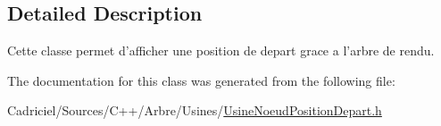 \subsection{Detailed Description}
Cette classe permet d'afficher une position de depart grace a l'arbre de rendu. 

The documentation for this class was generated from the following file\-:\begin{DoxyCompactItemize}
\item 
Cadriciel/\-Sources/\-C++/\-Arbre/\-Usines/\hyperlink{_usine_noeud_position_depart_8h}{Usine\-Noeud\-Position\-Depart.\-h}\end{DoxyCompactItemize}

